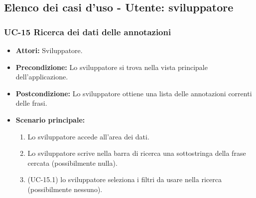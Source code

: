 \subsection{Elenco dei casi d'uso - Utente: sviluppatore}	\subsubsection{UC-15 Ricerca dei dati delle annotazioni}	
		\begin{itemize}
			\item \textbf{Attori:} Sviluppatore.
			\item \textbf{Precondizione:} Lo sviluppatore si trova nella vista principale dell'applicazione.
			\item \textbf{Postcondizione:} Lo sviluppatore ottiene una lista delle annotazioni correnti delle frasi.
			\item \textbf{Scenario principale:}
				\begin{enumerate}
					\item Lo sviluppatore accede all'area dei dati.
					\item Lo sviluppatore scrive nella barra di ricerca una sottostringa della frase cercata (possibilmente nulla).
					\item (UC-15.1) lo sviluppatore seleziona i filtri da usare nella ricerca (possibilmente nessuno).
				\end{enumerate}
		\end{itemize}
	
